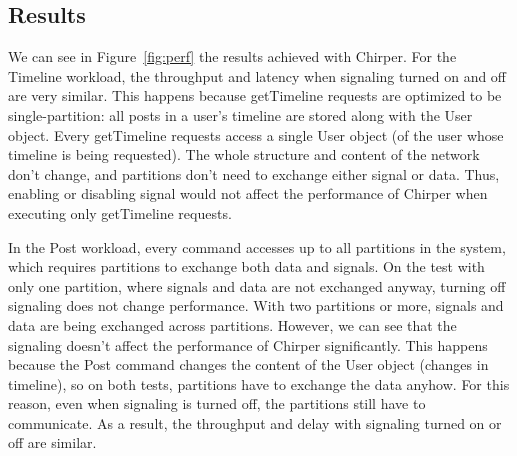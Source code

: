 \documentclass[11pt]{article}
\newcommand{\ssmr}{\mbox{S-SMR}}
\newcommand{\dssmr}{\mbox{DS-SMR}}
\newcommand{\appname}{Chirper} %
\begin{document}
\subsection{Results}

We can see in Figure~\ref{fig:perf} the results achieved with \appname{}.
For the Timeline workload, the throughput and latency when signaling turned on and off are very similar.
This happens because getTimeline requests are optimized to be single-partition:
all posts in a user's timeline are stored along with the User object.
Every getTimeline requests access a single User object (of the user whose timeline is being requested). 
The whole structure and content of the network don't change, and partitions don't need to exchange either signal or data.
Thus, enabling or disabling signal would not affect the performance of \appname{} when executing only getTimeline requests.

In the Post workload, every command accesses up to all partitions in the system, which requires partitions to exchange both data and signals. 
On the test with only one partition, where signals and data are not exchanged anyway, turning off signaling does not change performance.
With two partitions or more, signals and data are being exchanged across partitions. However, we can see that the signaling doesn't affect the performance of \appname{} significantly. This happens because the Post command changes the content of the User object (changes in timeline), so on both tests, partitions have to exchange the data anyhow. For this reason, even when signaling is turned off, the partitions still have to communicate. As a result, the throughput and delay with signaling turned on or off are similar.

\end{document}
